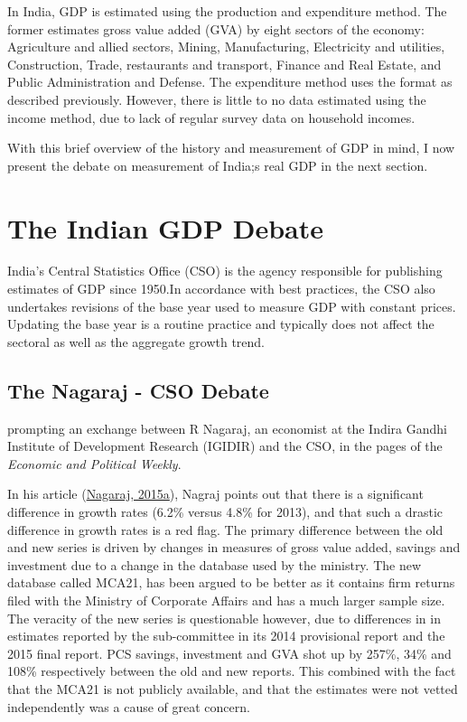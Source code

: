 \documentclass[12pt,nobind, a4paper]{reedthesis}
\begin{document}
 In India, GDP is estimated using the production and expenditure method. The former estimates gross value added (GVA) by eight sectors of the economy: Agriculture and allied sectors, Mining, Manufacturing, Electricity and utilities, Construction, Trade, restaurants and transport, Finance and Real Estate, and Public Administration and Defense. The expenditure method uses the format as described previously. However, there is little to no data estimated using the income method, due to lack of regular survey data on household incomes.
 \linebreak

 With this brief overview of the history and measurement of GDP in mind, I now present the debate on measurement of India;s real GDP in the next section.

 \hypertarget{the-indian-gdp-debate}{%
 \section{The Indian GDP Debate}\label{the-indian-gdp-debate}}

 India's Central Statistics Office (CSO) is the agency responsible for publishing estimates of GDP since 1950.In accordance with best practices, the CSO also undertakes revisions of the base year used to measure GDP with constant prices. Updating the base year is a routine practice and typically does not affect the sectoral as well as the aggregate growth trend.

 \hypertarget{the-nagaraj---cso-debate}{%
 \subsection{The Nagaraj - CSO Debate}\label{the-nagaraj---cso-debate}}

 prompting an exchange between R Nagaraj, an economist at the Indira Gandhi Institute of Development Research (IGIDIR) and the CSO, in the pages of the \emph{Economic and Political Weekly}.
 \linebreak

 In his article (\protect\hyperlink{ref-nagaraj_seeds_2015-1}{Nagaraj, 2015a}), Nagraj points out that there is a significant difference in growth rates (6.2\% versus 4.8\% for 2013), and that such a drastic difference in growth rates is a red flag. The primary difference between the old and new series is driven by changes in measures of gross value added, savings and investment due to a change in the database used by the ministry. The new database called MCA21, has been argued to be better as it contains firm returns filed with the Ministry of Corporate Affairs and has a much larger sample size. The veracity of the new series is questionable however, due to differences in in estimates reported by the sub-committee in its 2014 provisional report and the 2015 final report. PCS savings, investment and GVA shot up by 257\%, 34\% and 108\% respectively between the old and new reports. This combined with the fact that the MCA21 is not publicly available, and that the estimates were not vetted independently was a cause of great concern.
 \linebreak
\end{document}
